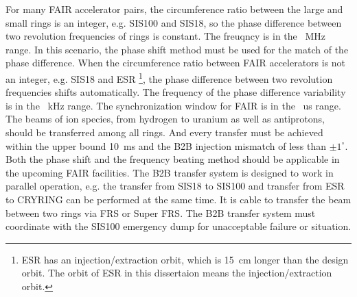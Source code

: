 For many FAIR accelerator pairs, the circumference ratio between the large and small rings is an integer, e.g. SIS100 and SIS18, so the phase difference between two revolution frequencies of rings is constant. The freuqncy is in the \SI{}{MHz} range. In this scenario, the phase shift method must be used for the match of the phase difference. When the circumference ratio between FAIR accelerators is not an integer, e.g. SIS18 and ESR \footnote{ESR has an injection/extraction orbit, which is \SI{15}{cm} longer than the design orbit. The orbit of ESR in this dissertaion means the injection/extraction orbit.}, the phase difference between two revolution frequencies shifts automatically. The frequency of the phase difference variability is in the \SI{}{kHz} range. The synchronization window for FAIR is in the \SI{}{us} range. The beams of ion species, from hydrogen to uranium as well as antiprotons, should be transferred among all rings. And every transfer must be achieved within the upper bound \SI{10}{ms} and the B2B injection mismatch of less than $\pm1^\circ$. Both the phase shift and the frequency beating method should be applicable in the upcoming FAIR facilities. The B2B transfer system is designed to work in parallel operation, e.g. the transfer from SIS18 to SIS100 and transfer from ESR to CRYRING can be performed at the same time. It is cable to transfer the beam between two rings via FRS or Super FRS. The B2B transfer system must coordinate with the SIS100 emergency dump for unacceptable failure or situation. 


